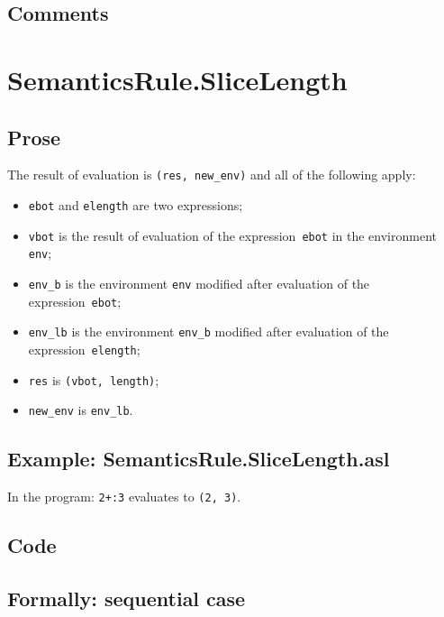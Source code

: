 \documentclass{book}
\begin{document}
  \subsection{Comments}

\section{SemanticsRule.SliceLength \label{sec:SemanticsRule.SliceLength}}

  \subsection{Prose}
  The result of evaluation is \texttt{(res, new\_env)} and all of the following
apply:
  \begin{itemize}
  \item \texttt{ebot} and \texttt{elength} are two expressions;
  \item \texttt{vbot} is the result of evaluation of the expression~\texttt{ebot} in the environment \texttt{env}; 
  \item \texttt{env\_b} is the environment \texttt{env} modified after evaluation of the expression~\texttt{ebot}; 
  \item \texttt{env\_lb} is the environment \texttt{env\_b} modified after evaluation of the expression~\texttt{elength};
  \item \texttt{res} is \texttt{(vbot, length)};
  \item \texttt{new\_env} is \texttt{env\_lb}.
  \end{itemize}

  \subsection{Example: SemanticsRule.SliceLength.asl}
  In the program:
  \texttt{2+:3} evaluates to \texttt{(2, 3)}.

  \subsection{Code}

  \subsection{Formally: sequential case}
  \begin{align}
  \end{align} 
\end{document}
